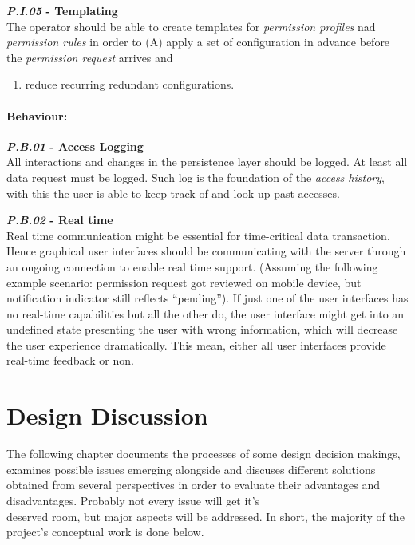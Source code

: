 \documentclass[12pt,english,a4paper,titlepage,cleardoublepage=empty,dottedtoc]{report}
\providecommand{\tightlist}{%
  \setlength{\itemsep}{0pt}\setlength{\parskip}{0pt}}
\begin{document}
\textbf{\emph{\protect\hypertarget{pi05}{}{P.I.05}} - Templating}\\
The operator should be able to create templates for \emph{permission
profiles} nad \emph{permission rules} in order to (A) apply a set of
configuration in advance before the \emph{permission request} arrives
and

\begin{enumerate}
\def\labelenumi{(\Alph{enumi})}
\setcounter{enumi}{1}
\tightlist
\item
  reduce recurring redundant configurations.
\end{enumerate}

\subsubsection{Behaviour:}\label{behaviour}

\textbf{\emph{\protect\hypertarget{pb01}{}{P.B.01}} - Access Logging}\\
All interactions and changes in the persistence layer should be logged.
At least all data request must be logged. Such log is the foundation of
the \emph{access history}, with this the user is able to keep track of
and look up past accesses.

\textbf{\emph{\protect\hypertarget{pb02}{}{P.B.02}} - Real time}\\
Real time communication might be essential for time-critical data
transaction. Hence graphical user interfaces should be communicating
with the server through an ongoing connection to enable real time
support. (Assuming the following example scenario: permission request
got reviewed on mobile device, but notification indicator still reflects
``pending''). If just one of the user interfaces has no real-time
capabilities but all the other do, the user interface might get into an
undefined state presenting the user with wrong information, which will
decrease the user experience dramatically. This mean, either all user
interfaces provide real-time feedback or non.

\hypertarget{design-discussion}{\chapter{Design
Discussion}\label{design-discussion}}

The following chapter documents the processes of some design decision
makings, examines possible issues emerging alongside and discuses
different solutions obtained from several perspectives in order to
evaluate their advantages and disadvantages. Probably not every issue
will get it's\\
deserved room, but major aspects will be addressed. In short, the
majority of the project's conceptual work is done below.
\end{document}
